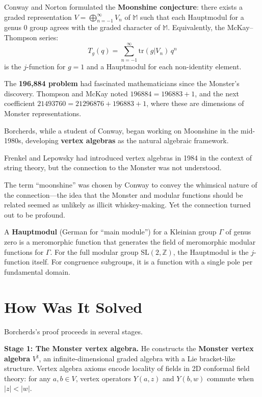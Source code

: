 Conway and Norton formulated the \textbf{Moonshine conjecture}:
there exists a graded representation
$V=\bigoplus_{n=-1}^{\infty}V_n$ of $\mathbb{M}$ such that each
Hauptmodul for a genus 0 group agrees with the graded character of
$\mathbb{M}$.  Equivalently, the McKay--Thompson series:
\[
  T_g(q) = \sum_{n=-1}^{\infty}\mathrm{tr}(g|V_n)\,q^n
\]
is the $j$-function for $g=1$ and a Hauptmodul for each
non-identity element.

The \textbf{196,884 problem} had fascinated mathematicians since the
Monster's discovery.  Thompson and McKay noted
$196884 = 196883+1$, and the next coefficient
$21493760 = 21296876+196883+1$, where these are dimensions of
Monster representations.

Borcherds, while a student of Conway, began working on Moonshine in
the mid-1980s, developing \textbf{vertex algebras} as the natural
algebraic framework.

Frenkel and Lepowsky had introduced vertex algebras in 1984 in the
context of string theory, but the connection to the Monster was not
understood.

The term ``moonshine'' was chosen by Conway to convey the whimsical
nature of the connection---the idea that the Monster and modular
functions should be related seemed as unlikely as illicit
whiskey-making.  Yet the connection turned out to be profound.

A \textbf{Hauptmodul} (German for ``main module'') for a Kleinian
group $\Gamma$ of genus zero is a meromorphic function that
generates the field of meromorphic modular functions for $\Gamma$.
For the full modular group $\mathrm{SL}(2,\mathbb{Z})$, the
Hauptmodul is the $j$-function itself.  For congruence subgroups,
it is a function with a single pole per fundamental domain.

\section{How Was It Solved}

Borcherds's proof \cite{borcherds1992} proceeds in several stages.

\textbf{Stage 1: The Monster vertex algebra.}
He constructs the \textbf{Monster vertex algebra} $V^{\natural}$,
an infinite-dimensional graded algebra with a Lie bracket-like
structure.  Vertex algebra axioms encode locality of fields in 2D
conformal field theory: for any $a,b\in V$, vertex operators
$Y(a,z)$ and $Y(b,w)$ commute when $|z|<|w|$.

